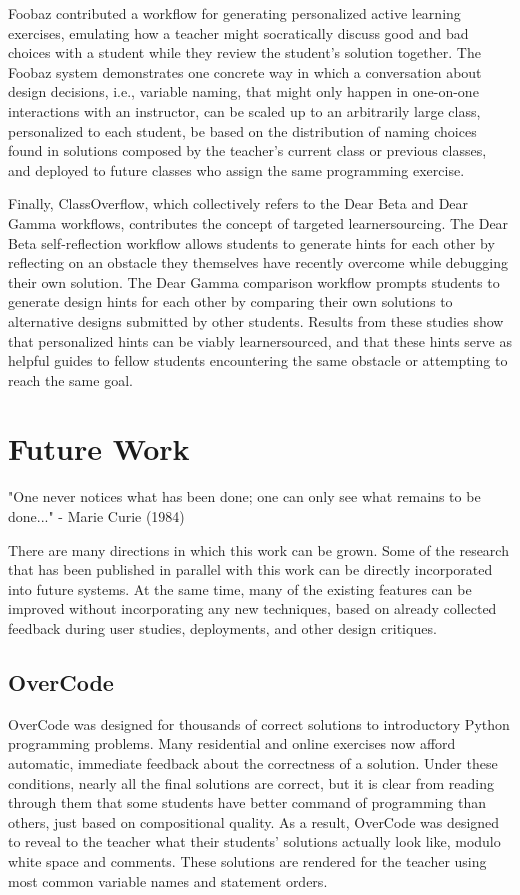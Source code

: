 Foobaz contributed a workflow for generating personalized active learning exercises, emulating how a teacher might socratically discuss good and bad choices with a student while they review the student's solution together. The Foobaz system demonstrates one concrete way in which a conversation about design decisions, i.e., variable naming, that might only happen in one-on-one interactions with an instructor, can be scaled up to an arbitrarily large class, personalized to each student, be based on the distribution of naming choices found in solutions composed by the teacher's current class or previous classes, and deployed to future classes who assign the same programming exercise.

Finally, ClassOverflow, which collectively refers to the Dear Beta and Dear Gamma workflows, contributes the concept of targeted learnersourcing. The Dear Beta self-reflection workflow allows students to generate hints for each other by reflecting on an obstacle they themselves have recently overcome while debugging their own solution. The Dear Gamma comparison workflow prompts students to generate design hints for each other by comparing their own solutions to alternative designs submitted by other students. Results from these studies show that personalized hints can be viably learnersourced, and that these hints serve as helpful guides to fellow students encountering the same obstacle or attempting to reach the same goal.

\section{Future Work}
"One never notices what has been done; one can only see what remains to be done..." - Marie Curie (1984)

There are many directions in which this work can be grown. Some of the research that has been published in parallel with this work can be directly incorporated into future systems. At the same time, many of the existing features can be improved without incorporating any new techniques, based on already collected feedback during user studies, deployments, and other design critiques.

\subsection{OverCode}

OverCode was designed for thousands of correct solutions to introductory Python programming problems. Many residential and online exercises now afford automatic, immediate feedback about the correctness of a solution. Under these conditions, nearly all the final solutions are correct, but it is clear from reading through them that some students have better command of programming than others, just based on compositional quality. As a result, OverCode was designed to reveal to the teacher what their students' solutions actually look like, modulo white space and comments. These solutions are rendered for the teacher using most common variable names and statement orders. 

